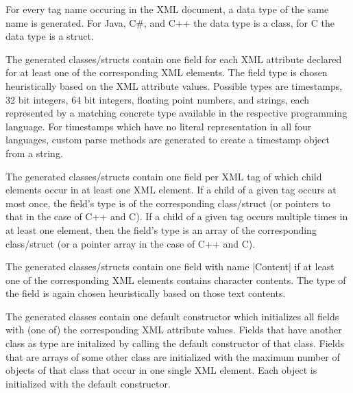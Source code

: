 \documentclass[a4paper]{article}
\newcommand{\code}{\clojureinline}
\begin{document}
\begin{compactenum}
\item For every tag name occuring in the XML document, a data type of the same
  name is generated.  For Java, C\#, and C++ the data type is a class, for C
  the data type is a struct.
\item The generated classes/structs contain one field for each XML attribute
  declared for at least one of the corresponding XML elements.  The field type
  is chosen heuristically based on the XML attribute values.  Possible types
  are timestamps, 32 bit integers, 64 bit integers, floating point numbers, and
  strings, each represented by a matching concrete type available in the
  respective programming language.  For timestamps which have no literal
  representation in all four languages, custom parse methods are generated to
  create a timestamp object from a string.
\item The generated classes/structs contain one field per XML tag of which
  child elements occur in at least one XML element.  If a child of a given tag
  occurs at most once, the field's type is of the corresponding class/struct
  (or pointers to that in the case of C++ and C).  If a child of a given tag
  occurs multiple times in at least one element, then the field's type is an
  array of the corresponding class/struct (or a pointer array in the case of
  C++ and C).
\item The generated classes/structs contain one field with name \code|Content|
  if at least one of the corresponding XML elements contains character
  contents.  The type of the field is again chosen heuristically based on those
  text contents.
\item The generated classes contain one default constructor which initializes
  all fields with (one of) the corresponding XML attribute values.  Fields that
  have another class as type are initalized by calling the default constructor
  of that class.  Fields that are arrays of some other class are initialized
  with the maximum number of objects of that class that occur in one single XML
  element.  Each object is initialized with the default constructor.


\end{compactenum}
\end{document}
